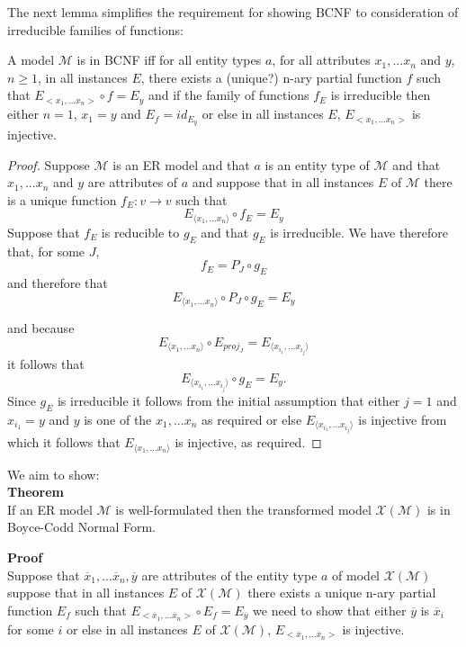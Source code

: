 \documentclass[10pt,a4paper]{article}
\newcommand{\genericmodel}{\mathcal{M}}
\newcommand{\logtophys}{\mathcal{X}}
\newcommand{\Vtype}{v}
\begin{document}
\noindent The next lemma simplifies the requirement for showing BCNF to consideration of irreducible families of functions:
\begin{lemma}
A model $\genericmodel$ is in BCNF iff
for all entity types $a$, for all attributes $x_1,...x_n$ and $y$, $n \geq 1$, 
in all instances $E$, there exists a (unique?) n-ary partial function
$f$ such that $E_{<x_1,...x_n>} \circ f = E_y$ and if the family of functions $f_E$ is irreducible then either 
$n=1$, $x_1=y$ and $E_f=id_{E_y}$
 or else in all instances
$E$, $E_{<x_1,...x_n>}$ is injective. 
\end{lemma}
\begin{proof}
Suppose $\genericmodel$ is an ER model and that $a$ is an entity type of $\genericmodel$ and that $x_1,...x_n$ and $y$ 
are attributes of $a$ and suppose that in all instances $E$ of $\genericmodel$ there is a unique function $f_E : \Vtype \rightarrow \Vtype$
such that
$$
E_{\langle x_1,...x_n \rangle} \circ f_E = E_y
$$
Suppose that $f_E$ is reducible to $g_E$ and that  $g_E$ is irreducible. We have therefore that, for some $J$,
$$
f_E=P_J \circ g_E
$$ 
and therefore that
$$
E_{\langle x_1,...x_n \rangle} \circ P_J \circ g_E = E_y
$$

\noindent and because 
$$
E_{\langle x_1,...x_n \rangle} \circ E_{proj_J} = E_{\langle x_{i_1},...x_{i_j} \rangle}
$$
it follows that
$$
E_{\langle x_{i_1},...x_{i_j} \rangle} \circ g_E = E_y.
$$
Since $g_E$ is irreducible it follows from the initial assumption that either $j=1$ and $x_{i_1}=y$ and $y$ is one of the 
$x_1,...x_n$ as required or else $E_{\langle x_{i_1},...x_{i_j} \rangle}$ is injective from which it follows that 
$E_{\langle x_1,...x_n \rangle}$ is injective, as required.
\end{proof}

\noindent We aim to show:\\
\noindent \textbf{Theorem}\\
\noindent If an ER model $\genericmodel$ is well-formulated  then the 
transformed model $\logtophys(\genericmodel)$  is in Boyce-Codd Normal Form.  \\

\newcommand{\phys}[1]{\overline{#1}}
\newcommand{\genericphysical}{\logtophys(\genericmodel)}

\noindent \textbf{Proof}\\
\noindent Suppose that $\phys{x}_1,...\phys{x}_n,\phys{y}$ are attributes of the entity type $a$ of model $\genericphysical$ suppose 
that in all instances $E$ of $\genericphysical$ there exists a unique n-ary partial function
$E_f$ such that 
$E_{<\phys{x}_1,...\phys{x}_n>} \circ E_f = E_{\phys{y}}$ 
we need to show that 
either $\phys{y}$ is $\phys{x}_i$ for some $i$ or else in all instances
$E$ of $\genericphysical$, $E_{<\phys{x}_1,...\phys{x}_n>}$ is injective. \\
\end{document}
